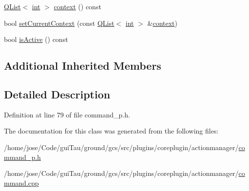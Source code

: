 \begin{DoxyCompactItemize}
\item 
\hyperlink{class_q_list}{Q\-List}$<$ \hyperlink{ioapi_8h_a787fa3cf048117ba7123753c1e74fcd6}{int} $>$ \hyperlink{group___core_plugin_ga1e8dc09d7c244c60c76b7f1172d06306}{context} () const 
\item 
bool \hyperlink{group___core_plugin_ga78bfa0e5af7039a14d90916f62838a9b}{set\-Current\-Context} (const \hyperlink{class_q_list}{Q\-List}$<$ \hyperlink{ioapi_8h_a787fa3cf048117ba7123753c1e74fcd6}{int} $>$ \&\hyperlink{group___core_plugin_ga1e8dc09d7c244c60c76b7f1172d06306}{context})
\item 
bool \hyperlink{group___core_plugin_ga0cd4c52ee2c1e36aa798b537686b88f5}{is\-Active} () const 
\end{DoxyCompactItemize}
\subsection*{Additional Inherited Members}


\subsection{Detailed Description}


Definition at line 79 of file command\-\_\-p.\-h.



The documentation for this class was generated from the following files\-:\begin{DoxyCompactItemize}
\item 
/home/jose/\-Code/gui\-Tau/ground/gcs/src/plugins/coreplugin/actionmanager/\hyperlink{command__p_8h}{command\-\_\-p.\-h}\item 
/home/jose/\-Code/gui\-Tau/ground/gcs/src/plugins/coreplugin/actionmanager/\hyperlink{command_8cpp}{command.\-cpp}\end{DoxyCompactItemize}
